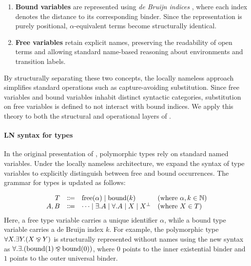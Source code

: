 \begin{enumerate}
    \item \textbf{Bound variables} are represented using \emph{de Bruijn indices} \citep{DB72}, where each index denotes the distance to its corresponding binder. Since the representation is purely positional, $\alpha$-equivalent terms become structurally identical.
    \item \textbf{Free variables} retain explicit names, preserving the readability of open terms and allowing standard name-based reasoning about environments and transition labels.
\end{enumerate}

By structurally separating these two concepts, the locally nameless approach simplifies standard operations such as capture-avoiding substitution. Since free variables and bound variables inhabit distinct syntactic categories, substitution on free variables is defined to not interact with bound indices. We apply this theory to both the structural and operational layers of \pill{}.

\paragraph{LN syntax for types}\label{par:ln-syntax-types}
In the original presentation of \pill{}, polymorphic types rely on standard named variables. Under the locally nameless architecture, we expand the syntax of type variables to explicitly distinguish between free and bound occurrences. The grammar for types is updated as follows:
\begin{highlight}
\[
\begin{array}{rcll}
  T & \Coloneqq & \text{free}(\alpha) \mid \text{bound}(k) & (\text{where } \alpha, k \in \mathbb{N}) \\
  A, B & \Coloneqq & \dots \mid \exists.A \mid \forall.A \mid X \mid X^\bot & (\text{where } X \in T) 
\end{array}
\]
Here, a free type variable carries a unique identifier $\alpha$, while a bound type variable carries a de Bruijn index $k$. For example, the polymorphic type $\forall X. \exists Y. (X \mathbin{\bindnasrepma} Y)$ is structurally represented without names using the new syntax as $\forall. \exists. (\text{bound}(1) \mathbin{\bindnasrepma} \text{bound}(0))$, where $0$ points to the inner existential binder and $1$ points to the outer universal binder.
\end{highlight}


